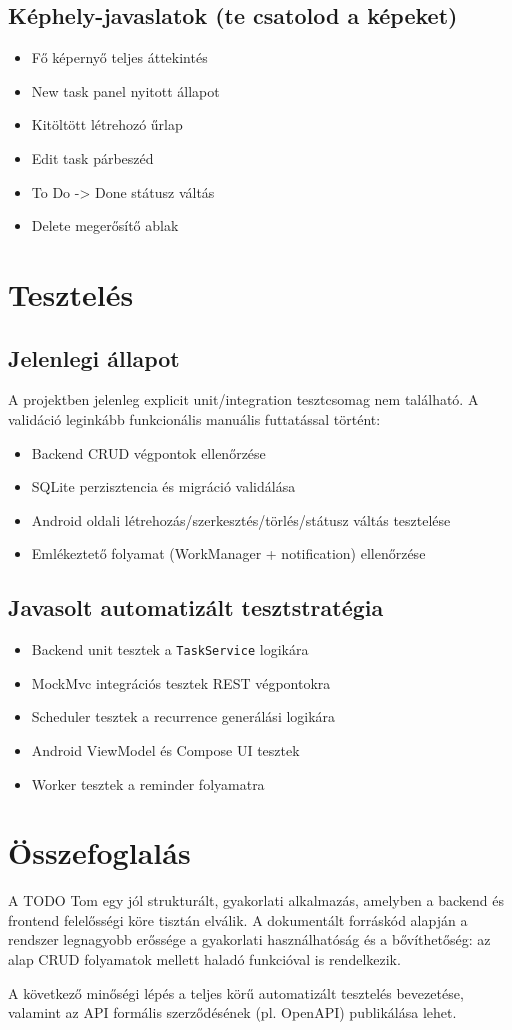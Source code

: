 \documentclass[12pt,a4paper]{article}
\begin{document}
\subsection{Képhely-javaslatok (te csatolod a képeket)}
\begin{itemize}
  \item Fő képernyő teljes áttekintés
  \item New task panel nyitott állapot
  \item Kitöltött létrehozó űrlap
  \item Edit task párbeszéd
  \item To Do -> Done státusz váltás
  \item Delete megerősítő ablak
\end{itemize}

\section{Tesztelés}
\subsection{Jelenlegi állapot}
A projektben jelenleg explicit unit/integration tesztcsomag nem található. A validáció leginkább funkcionális manuális futtatással történt:
\begin{itemize}
  \item Backend CRUD végpontok ellenőrzése
  \item SQLite perzisztencia és migráció validálása
  \item Android oldali létrehozás/szerkesztés/törlés/státusz váltás tesztelése
  \item Emlékeztető folyamat (WorkManager + notification) ellenőrzése
\end{itemize}

\subsection{Javasolt automatizált tesztstratégia}
\begin{itemize}
  \item Backend unit tesztek a \texttt{TaskService} logikára
  \item MockMvc integrációs tesztek REST végpontokra
  \item Scheduler tesztek a recurrence generálási logikára
  \item Android ViewModel és Compose UI tesztek
  \item Worker tesztek a reminder folyamatra
\end{itemize}

\section{Összefoglalás}
A TODO Tom egy jól strukturált, gyakorlati alkalmazás, amelyben a backend és frontend felelősségi köre tisztán elválik. A dokumentált forráskód alapján a rendszer legnagyobb erőssége a gyakorlati használhatóság és a bővíthetőség: az alap CRUD folyamatok mellett haladó funkcióval is rendelkezik.

A következő minőségi lépés a teljes körű automatizált tesztelés bevezetése, valamint az API formális szerződésének (pl. OpenAPI) publikálása lehet.
\end{document}
